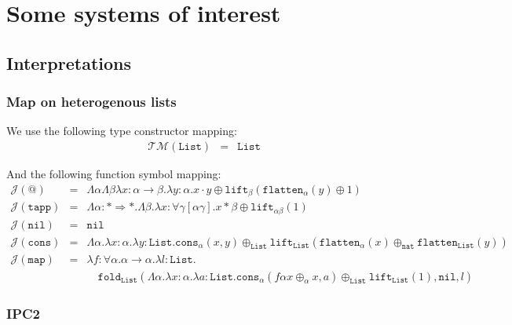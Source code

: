 \documentclass[runningheads,a4paper]{llncs}
\newcommand{\Typemap}{\mathcal{T\!M}}
\newcommand{\Termmap}{\mathcal{J}}
\newcommand{\quant}[2]{\forall #1[#2]}
\newcommand{\arrtype}{\rightarrow}
\newcommand{\arrkind}{\Rightarrow}
\newcommand{\abs}[2]{\lambda #1.#2}
\newcommand{\tabs}[2]{\Lambda #1.#2}
\newcommand{\nat}{\mathtt{nat}}
\newcommand{\flatten}{\mathtt{flatten}}
\newcommand{\lift}{\mathtt{lift}}
\newcommand{\List}{\mathtt{List}}
\newcommand{\nil}{\mathtt{nil}}
\newcommand{\cons}{\mathtt{cons}}
\newcommand{\fold}{\mathtt{fold}}
\begin{document}
\section{Some systems of interest}

\subsection{Interpretations}

\subsubsection{Map on heterogenous lists}

We use the following type constructor mapping:
\[
\begin{array}{rcl}
  \Typemap(\List) & = & \List
\end{array}
\]

And the following function symbol mapping:
\[
\begin{array}{rcl}
\Termmap(@) & = & \Lambda\alpha\Lambda\beta\lambda x: \alpha \arrtype \beta . \lambda y :
  \alpha . x \cdot y \oplus \lift_\beta(\flatten_\alpha(
  y) \oplus 1) \\
\Termmap(\mathtt{tapp}) & = & \Lambda \alpha : * \arrkind * . \Lambda \beta . \lambda x : \quant{\gamma}{\alpha\gamma} . x * \beta \oplus \lift_{\alpha\beta}(1) \\
\Termmap(\mathtt{nil}) & = & \nil \\
\Termmap(\mathtt{cons}) & = & \tabs{\alpha}{\abs{x:\alpha}{\abs{y:\List}{\cons_\alpha(x,y)\oplus_\List \lift_\List(\flatten_\alpha(x) \oplus_\nat \flatten_\List(y))}}} \\
\Termmap(\mathtt{map}) & = & \lambda f:\forall\alpha . \alpha\arrtype\alpha . \lambda l:\List . \\
& &\quad\fold_\List(\tabs{\alpha}{\abs{x:\alpha}{\abs{a:\List}{\cons_\alpha(f \alpha x \oplus_\alpha x, a)\oplus_\List \lift_\List(1)}}},\nil,l)
\end{array}
\]

\subsubsection{IPC2}
\end{document}
